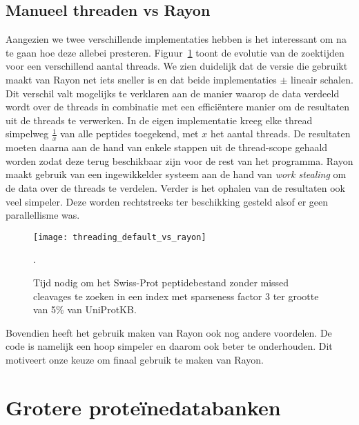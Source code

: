\subsection{Manueel threaden vs Rayon}\label{subsec:manueel-threaden-vs-rayon}
Aangezien we twee verschillende implementaties hebben is het interessant om na te gaan hoe deze allebei presteren.
Figuur~\ref{fig:threading_default_vs_rayon} toont de evolutie van de zoektijden voor een verschillend aantal threads.
We zien duidelijk dat de versie die gebruikt maakt van Rayon net iets sneller is en dat beide implementaties $\pm$ lineair schalen.
Dit verschil valt mogelijks te verklaren aan de manier waarop de data verdeeld wordt over de threads in combinatie met een efficiëntere manier om de resultaten uit de threads te verwerken.
In de eigen implementatie kreeg elke thread simpelweg $\frac{1}{x}$ van alle peptides toegekend, met $x$ het aantal threads.
De resultaten moeten daarna aan de hand van enkele stappen uit de thread-scope gehaald worden zodat deze terug beschikbaar zijn voor de rest van het programma.
Rayon maakt gebruik van een ingewikkelder systeem aan de hand van \textit{work stealing}\cite{rayon_stealing} om de data over de threads te verdelen.
Verder is het ophalen van de resultaten ook veel simpeler.
Deze worden rechtstreeks ter beschikking gesteld alsof er geen parallellisme was.

\begin{figure}[H]
    \centering
    \texttt{[image: threading\_default\_vs\_rayon]}
    \caption{Tijd nodig om het Swiss-Prot peptidebestand zonder missed cleavages te zoeken in een index met sparseness factor 3 ter grootte van 5\% van UniProtKB.}.
    \label{fig:threading_default_vs_rayon}
\end{figure}

Bovendien heeft het gebruik maken van Rayon ook nog andere voordelen.
De code is namelijk een hoop simpeler en daarom ook beter te onderhouden.
Dit motiveert onze keuze om finaal gebruik te maken van Rayon.


\section{Grotere proteïnedatabanken}
